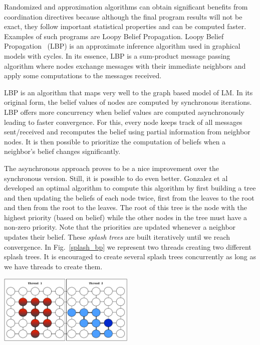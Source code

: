 Randomized and approximation algorithms can obtain significant benefits from
coordination directives because although the final program results will not be
exact, they follow important statistical properties and can be computed faster.
Examples of such programs are Loopy Belief Propagation.
Loopy Belief Propagation~\cite{Murphy99loopybelief} (LBP) is an approximate inference algorithm
used in graphical models with cycles. In its essence, LBP is a sum-product message passing algorithm
where nodes exchange messages with their immediate neighbors and apply some computations to the messages
received.

LBP is an algorithm that maps very well to the graph based model of LM. In its
original form, the belief values of nodes are computed by synchronous iterations.
LBP offers more concurrency when belief values are computed asynchronously
leading to faster convergence. For this, every node keeps track of all messages
sent/received and recomputes the belief using partial information from neighbor
nodes. It is then possible to prioritize the computation of beliefs when a
neighbor's belief changes significantly.

The asynchronous approach proves to be a nice improvement over the synchronous
version. Still, it is possible to do even better. Gonzalez et
al~\cite{Gonzalez+al:aistats09paraml} developed an optimal algorithm to compute
this algorithm by first building a tree and then updating the beliefs of each
node twice, first from the leaves to the root and then from the root to the
leaves. The root of this tree is the node with the highest priority (based on
belief) while the other nodes in the tree must have a non-zero priority.
Note that the priorities are updated whenever a neighbor updates their belief.
These \emph{splash trees} are built iteratively until we reach convergence.
In Fig.~\ref{splash_bp} we represent two threads creating two different splash
trees. It is encouraged to create several splash trees concurrently as long as
we have threads to create them.

\begin{topfig}
   \begin{center}
      \includegraphics[width=6.5cm]{figures/splash_bp}
   \end{center}
\end{topfig}


